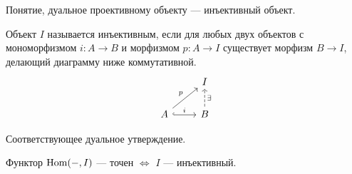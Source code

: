 \documentclass[../hw_main.tex]{subfiles}
\begin{document}
Понятие, дуальное проективному объекту --- инъективный объект.
\begin{to_def}\label{injective_def}
Объект $I$ называется инъективным, если для любых двух объектов с мономорфизмом $i:A\to B$ и морфизмом $p:A\to I$ существует морфизм $B\to I$, делающий диаграмму ниже коммутативной.
\begin{equation}\label{injective_def_diagram}
\begin{tikzcd}
	& I \\
	A & B
	\arrow["i", hook, from=2-1, to=2-2]
	\arrow["p", from=2-1, to=1-2]
	\arrow["\exists"', dashed, from=2-2, to=1-2]
\end{tikzcd}
\end{equation}
\end{to_def}
Соответствующее дуальное утверждение.
\begin{to_suj}
Функтор $\operatorname{Hom}(-, I)$ --- точен $\iff$ $I$ --- инъективный.
\end{to_suj}
\end{document}
